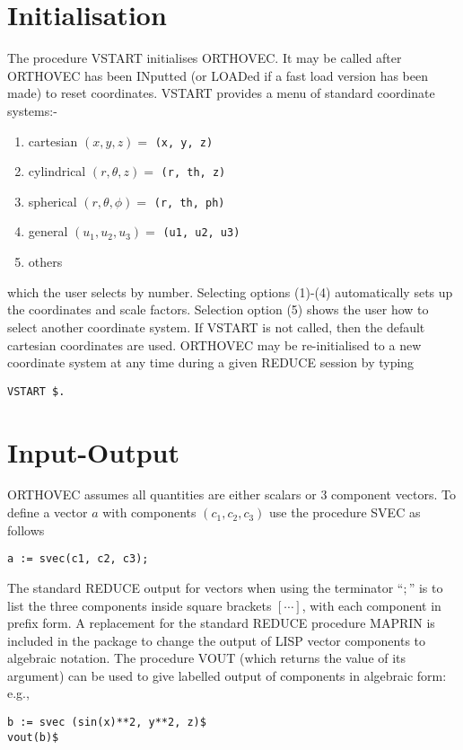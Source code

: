 \section{Initialisation}
The procedure VSTART initialises ORTHOVEC.  It may be
called after ORTHOVEC has been INputted (or LOADed if a fast load
version has been made) to reset coordinates.  VSTART provides a
menu of standard coordinate systems:-
\begin{enumerate}
\item cartesian $(x, y, z) = $ {\tt (x, y, z)}
\item cylindrical $(r, \theta, z) = $ {\tt (r, th, z)}
\item spherical $(r, \theta, \phi) = $ {\tt (r, th, ph) }
\item general $( u_1, u_2, u_3 ) = $ {\tt (u1, u2, u3) }
\item others
\end{enumerate}
which the user selects by number.  Selecting options (1)-(4) 
automatically sets up the coordinates and scale factors.  
Selection option
(5) shows the user how to select another coordinate system.
If VSTART is not called, then the default cartesian coordinates are
used.
ORTHOVEC may be re-initialised to a new coordinate system at any 
time during a given REDUCE session by typing 
\begin{verbatim}
VSTART $.
\end{verbatim}

\section{Input-Output}

ORTHOVEC assumes all quantities are either 
scalars or 3 component vectors.  
To define a vector $a$ with components $(c_1, c_2, c_3)$ use
the procedure SVEC as follows
\begin{verbatim}
a := svec(c1, c2, c3);
\end{verbatim}

The standard REDUCE output for vectors when using the terminator ``$;$''
is to list the three components inside square brackets
$[\cdots]$, with each component in prefix form.  A replacement for the
standard REDUCE procedure MAPRIN is included in
the package to change the 
output of LISP vector components to algebraic notation.  The procedure
VOUT (which returns the value of its argument)
can be used to give labelled output of components 
in algebraic form: e.g.,
\begin{verbatim}
b := svec (sin(x)**2, y**2, z)$
vout(b)$
\end{verbatim}

